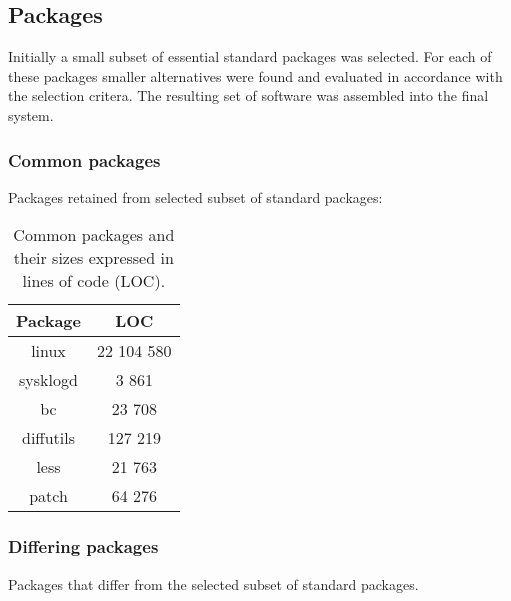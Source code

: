 \subsection{Packages}\label{Packages}

Initially a small subset of essential standard packages was selected. For each of these packages smaller alternatives were found and evaluated in accordance with the selection critera. The resulting set of software was assembled into the final system.

\subsubsection{Common packages}

Packages retained from selected subset of standard packages:

\begin{table}[!h]
    \centering
    \begin{tabular}{|c||c|}
        \hline
        Package & LOC \\
        \hline
        \hline
        linux \cite{linux} & 22 104 580 \\
        \hline
        sysklogd \cite{sysklogd} & 3 861 \\
        \hline
        bc \cite{bc} & 23 708 \\
        \hline        
        diffutils \cite{diffutils} & 127 219 \\
        \hline
        less \cite{less} & 21 763 \\
        \hline
        patch \cite{patch} & 64 276 \\
        \hline
    \end{tabular}
    \caption{Common packages and their sizes expressed in lines of code (LOC).}
\end{table}

\newpage

\subsubsection{Differing packages}

Packages that differ from the selected subset of standard packages.

